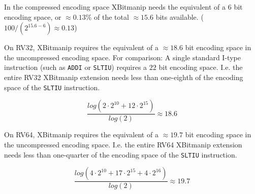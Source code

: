 In the compressed encoding space XBitmanip needs the equivalent of a 6 bit encoding space,
or $\approx 0.13\%$ of the total $\approx 15.6$ bits available. ($ 100 / (2^{15.6-6}) \approx 0.13 $)

On RV32, XBitmanip requires the equivalent of a $\approx 18.6$ bit encoding space in
the uncompressed encoding space. For comparison: A single standard I-type
instruction (such as \texttt{ADDI} or \texttt{SLTIU}) requires a $22$ bit
encoding space. I.e. the entire RV32 XBitmanip extension needs less than
one-eighth of the encoding space of the \texttt{SLTIU} instruction.

$$ \frac{log(2\cdot2^{10} + 12\cdot2^{15})}{log(2)} \approx 18.6 $$

On RV64, XBitmanip requires the equivalent of a $\approx 19.7$ bit encoding
space in the uncompressed encoding space. I.e. the entire RV64 XBitmanip
extension needs less than one-quarter of the encoding space of the
\texttt{SLTIU} instruction.

$$ \frac{log(4\cdot2^{10} + 17\cdot2^{15} + 4\cdot2^{16})}{log(2)} \approx 19.7 $$

